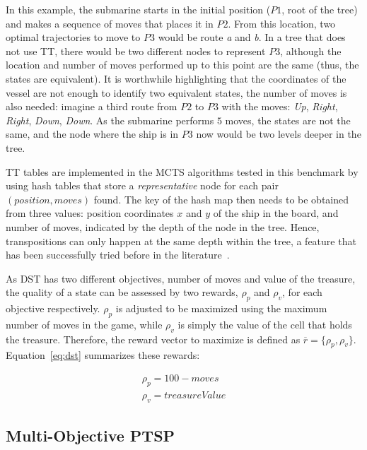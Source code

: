 \documentclass[journal]{IEEEtran}
\begin{document}
In this example, the submarine starts in the initial position ($P1$, root of the tree) and makes a sequence of moves that places it in $P2$. From this location, two optimal trajectories to move to $P3$ would be route \textit{a} and \textit{b}. In a tree that does not use TT, there would be two different nodes to represent $P3$, although the location and number of moves performed up to this point are the same (thus, the states are equivalent). It is worthwhile highlighting that the coordinates of the vessel are not enough to identify two equivalent states, the number of moves is also needed: imagine a third route from $P2$ to $P3$ with the moves: \textit{Up}, \textit{Right}, \textit{Right}, \textit{Down}, \textit{Down}. As the submarine performs $5$ moves, the states are not the same, and the node where the ship is in $P3$ now would be two levels deeper in the tree.

TT tables are implemented in the MCTS algorithms tested in this benchmark by using hash tables that store a \textit{representative} node for each pair $(position, moves)$ found.  The key of the hash map then needs to be obtained from three values: position coordinates $x$ and $y$ of the ship in the board, and number of moves, indicated by the depth of the node in the tree. Hence, transpositions can only happen at the same depth within the tree, a feature that has been successfully tried before in the literature~\cite{Kozelek2009}.

As DST has two different objectives, number of moves and value of the treasure, the quality of a state can be assessed by two rewards, $\rho_p$ and $\rho_v$, for each objective respectively. $\rho_p$ is adjusted to be maximized using the maximum number of moves in the game, while $\rho_v$ is simply the value of the cell that holds the treasure. Therefore, the reward vector to maximize is defined as $\overline{r} = \{ \rho_p, \rho_v\}$. Equation~\ref{eq:dst} summarizes these rewards:

\begin{equation}	\label{eq:dst}
\begin{split}
\rho_p = 100 - moves \\
\rho_v = treasureValue
\end{split}
\end{equation}


\subsection{Multi-Objective PTSP} \label{ssec:moptsp}
\end{document}
